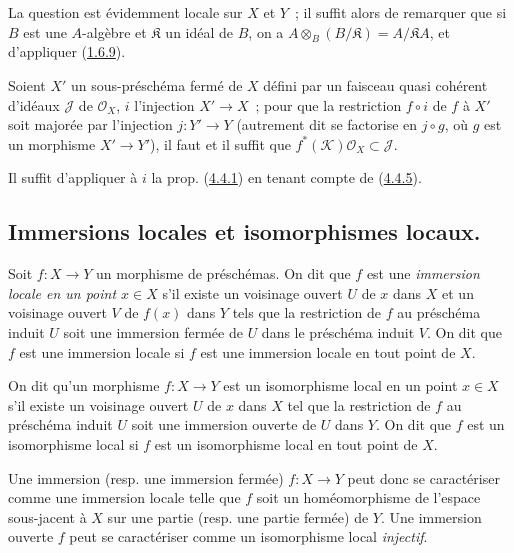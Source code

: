 La question est évidemment locale sur $X$ et $Y$~; il suffit alors de
remarquer que si $B$ est une $A$-algèbre et $\mathfrak{K}$ un idéal de $B$,
on a $A\otimes_B(B/\mathfrak{K})=A/\mathfrak{K}A$, et d'appliquer
(\hyperref[I.1.6.9-fr]{1.6.9}).

\begin{corollary}[4.4.6]
\label{I.4.4.6-fr}
Soient $X'$ un sous-préschéma fermé de $X$ défini par un faisceau quasi
cohérent d'idéaux $\mathscr{J}$ de $\mathscr{O}_X$, $i$ l'injection
$X'\to X$~; pour que la restriction $f\circ i$ de $f$ à $X'$ soit majorée
par l'injection $j:Y'\to Y$ (autrement dit se factorise en $j\circ g$, où
$g$ est un morphisme $X'\to Y'$), il faut et il suffit que
$f^*(\mathscr{K})\mathscr{O}_X\subset\mathscr{J}$.
\end{corollary}

Il suffit d'appliquer à $i$ la prop. (\hyperref[I.4.4.1-fr]{4.4.1}) en
tenant compte de (\hyperref[I.4.4.5-fr]{4.4.5}).

\subsection{Immersions locales et isomorphismes locaux.}
\label{subsection:I.4.5-fr}

\begin{definition}[4.5.1]
\label{I.4.5.1-fr}
Soit $f:X\to Y$ un morphisme de préschémas. On dit que $f$ est une
\emph{immersion locale en un point $x\in X$} s'il existe un voisinage ouvert
$U$ de $x$ dans $X$ et un voisinage ouvert $V$ de $f(x)$ dans $Y$ tels que
la restriction de $f$ au préschéma induit $U$ soit une immersion fermée de
$U$ dans le préschéma induit $V$. On dit que $f$ est une immersion locale si
$f$ est une immersion locale en tout point de $X$.
\end{definition}

\begin{definition}[4.5.2]
\label{I.4.5.2-fr}
On dit qu'un morphisme $f:X\to Y$ est un isomorphisme local en
un point $x\in X$ s'il existe un voisinage ouvert $U$ de $x$ dans $X$ tel
que la restriction de $f$ au préschéma induit $U$ soit une immersion ouverte
de $U$ dans $Y$. On dit que $f$ est un isomorphisme local si $f$ est un
isomorphisme local en tout point de $X$.
\end{definition}

\begin{env}[4.5.3]
\label{I.4.5.3-fr}
Une immersion (resp. une immersion fermée) $f:X\to Y$ peut donc se
caractériser comme une immersion locale telle que $f$ soit un homéomorphisme
de l'espace sous-jacent à $X$ sur une partie (resp. une partie fermée) de
$Y$. Une immersion ouverte $f$ peut se caractériser comme un isomorphisme
local \emph{injectif}.
\end{env}

